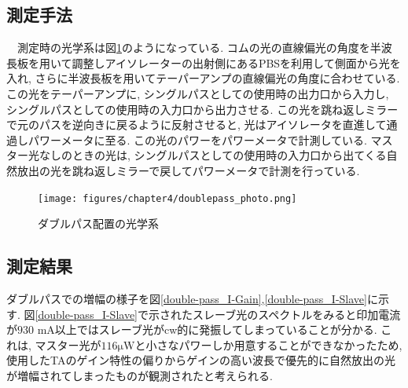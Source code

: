 \documentclass[uplatex, dvipdfmx, a4paper, report, papersize, 11pt]{jsbook}
\begin{document}
\subsection{測定手法}
　測定時の光学系は図\ref{doublepass_photo}のようになっている. コムの光の直線偏光の角度を半波長板を用いて調整しアイソレーターの出射側にあるPBSを利用して側面から光を入れ, さらに半波長板を用いてテーパーアンプの直線偏光の角度に合わせている. この光をテーパーアンプに, シングルパスとしての使用時の出力口から入力し, シングルパスとしての使用時の入力口から出力させる. この光を跳ね返しミラーで元のパスを逆向きに戻るように反射させると, 光はアイソレータを直進して通過しパワーメータに至る. この光のパワーをパワーメータで計測している. マスター光なしのときの光は, シングルパスとしての使用時の入力口から出てくる自然放出の光を跳ね返しミラーで戻してパワーメータで計測を行っている.
\begin{figure}[H]
 \begin{center}
  \texttt{[image: figures/chapter4/doublepass\_photo.png]}
\end{center}
 \caption{ダブルパス配置の光学系}
 \label{doublepass_photo}
\end{figure}

\subsection{測定結果}
ダブルパスでの増幅の様子を図\ref{double-pass_I-Gain},\ref{double-pass_I-Slave}に示す. 図\ref{double-pass_I-Slave}で示されたスレーブ光のスペクトルをみると印加電流が$930$ mA以上ではスレーブ光がcw的に発振してしまっていることが分かる. これは, マスター光が$116 \mathrm{\mu W}$と小さなパワーしか用意することができなかったため, 使用したTAのゲイン特性の偏りからゲインの高い波長で優先的に自然放出の光が増幅されてしまったものが観測されたと考えられる.
\end{document}
